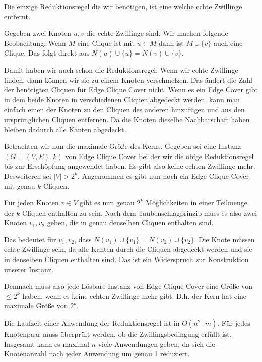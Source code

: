 
Die einzige Reduktionsregel die wir benötigen, ist eine welche echte Zwillinge entfernt.

Gegeben zwei Knoten $u, v$ die echte Zwillinge sind. Wir machen folgende Beobachtung: Wenn $M$ eine Clique ist mit $u \in M$ dann ist $M \cup \{v\}$ auch eine Clique. Das folgt direkt aus $N(u) \cup \{u\} = N(v) \cup \{v\}$.

Damit haben wir auch schon die Reduktionsregel: Wenn wir echte Zwillinge finden, dann können wir sie zu einem Knoten verschmelzen. Das ändert die Zahl der benötigten Cliquen für Edge Clique Cover nicht. Wenn es ein Edge Cover gibt in dem beide Knoten in verschiedenen Cliquen abgedeckt werden, kann man einfach einen der Knoten zu den Cliquen des anderen hinzufügen und aus den ursprünglichen Cliquen entfernen. Da die Knoten dieselbe Nachbarschaft haben bleiben dadurch alle Kanten abgedeckt.

Betrachten wir nun die maximale Größe des Kerns. Gegeben sei eine Instanz $(G=(V,E),k)$ von Edge Clique Cover bei der wir die obige Reduktionsregel bis zur Erschöpfung angewendet haben. Es gibt also keine echten Zwillinge mehr. Desweiteren sei $|V| > 2^k$. Angenommen es gibt nun noch ein Edge Clique Cover mit genau $k$ Cliquen.

Für jeden Knoten $v \in V$ gibt es nun genau $2^k$ Möglichkeiten in einer Teilmenge der $k$ Cliquen enthalten zu sein. Nach dem Taubenschlagprinzip muss es also zwei Knoten $v_1, v_2$ geben, die in genau denselben Cliquen enthalten sind.

Das bedeutet für $v_1, v_2$, dass $N(v_1) \cup \{v_1\} = N(v_2) \cup \{v_2\}$. Die Knote müssen echte Zwillinge sein, da alle Kanten durch die Cliquen abgedeckt werden und sie in denselben Cliquen enthalten sind. Das ist ein Widerspruch zur Konstruktion unserer Instanz.

Demnach muss also jede Lösbare Instanz von Edge Clique Cover eine Größe von $\leq 2^k$ haben, wenn es keine echten Zwillinge mehr gibt. D.h. der Kern hat eine maximale Größe von $2^k$.

Die Laufzeit einer Anwendung der Reduktionsregel ist in $O(n^2 \cdot m)$. Für jedes Knotenpaar muss überprüft werden, ob die Zwillingsbedingung erfüllt ist. Insgesamt kann es maximal $n$ viele Anwendungen geben, da sich die Knotenanzahl nach jeder Anwendung um genau 1 reduziert.

